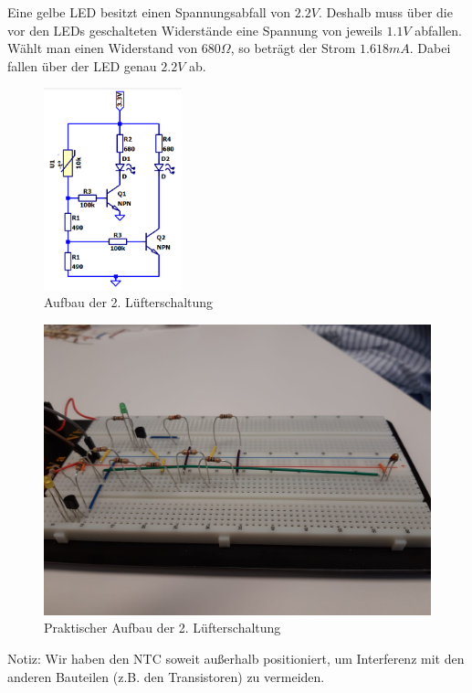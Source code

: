 \newpage

\noindent
Eine gelbe LED besitzt einen Spannungsabfall von $2.2 V$. Deshalb muss über die vor den LEDs geschalteten Widerstände eine Spannung von jeweils $1.1 V$ abfallen. Wählt man einen Widerstand von $680 \Omega$, so beträgt der Strom $1.618 mA$. Dabei fallen über der LED genau $2.2 V$ ab. \cite{diode}

\begin{figure}[htb]
    \includegraphics[width=4cm]{./res/Luefter_2_Spice}
    \caption{Aufbau der 2. Lüfterschaltung}
    \label{fig:Lüfterschaltung2}
\end{figure}

\begin{figure}[htb]
    \includegraphics[width=12cm]{./res/Luefter_2_Aufbau}
    \caption{Praktischer Aufbau der 2. Lüfterschaltung}
    \label{fig:Lüfterschaltung2Praktisch}
\end{figure}

\noindent
Notiz: Wir haben den NTC soweit außerhalb positioniert, um Interferenz mit den anderen Bauteilen (z.B. den Transistoren) zu vermeiden.

